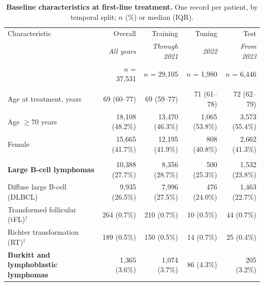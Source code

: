 \begin{table}[p]
\centering
\caption{\textbf{Baseline characteristics at first-line treatment.} One record per patient, by temporal split; $n$ (\%) or median (IQR).}
\label{tab:characteristics}
\scriptsize
\setlength{\tabcolsep}{4pt}
\renewcommand{\arraystretch}{0.96}
\begin{tabularx}{\textwidth}{@{}Xrrrr@{}}
\toprule
Characteristic & Overall & Training & Tuning & Test \\
 & {\scriptsize\itshape All years} & {\scriptsize\itshape Through 2021} & {\scriptsize\itshape 2022} & {\scriptsize\itshape From 2023} \\
& {\scriptsize $n$ = 37,531} & {\scriptsize $n$ = 29,105} & {\scriptsize $n$ = 1,980} & {\scriptsize $n$ = 6,446} \\
\midrule
\addlinespace[2pt]
\multicolumn{5}{@{}l}{\sffamily\bfseries Demographics}\\
\quad Age at treatment, years & 69 (60–77) & 69 (59–77) & 71 (61–78) & 72 (62–79) \\
\quad Age $\geq$70 years & 18,108 (48.2\%) & 13,470 (46.3\%) & 1,065 (53.8\%) & 3,573 (55.4\%) \\
\quad Female & 15,665 (41.7\%) & 12,195 (41.9\%) & 808 (40.8\%) & 2,662 (41.3\%) \\
\addlinespace[2pt]
\multicolumn{5}{@{}l}{\sffamily\bfseries Disease}\\
\quad \textbf{Large B-cell lymphomas} & 10,388 (27.7\%) & 8,356 (28.7\%) & 500 (25.3\%) & 1,532 (23.8\%) \\
\qquad Diffuse large B-cell (DLBCL) & 9,935 (26.5\%) & 7,996 (27.5\%) & 476 (24.0\%) & 1,463 (22.7\%) \\
\qquad Transformed follicular (tFL)$^{\dagger}$ & 264 (0.7\%) & 210 (0.7\%) & 10 (0.5\%) & 44 (0.7\%) \\
\qquad Richter transformation (RT)$^{\dagger}$ & 189 (0.5\%) & 150 (0.5\%) & 14 (0.7\%) & 25 (0.4\%) \\
\quad \textbf{Burkitt and lymphoblastic lymphomas} & 1,365 (3.6\%) & 1,074 (3.7\%) & 86 (4.3\%) & 205 (3.2\%) \\

\end{tabularx}
\end{table}
